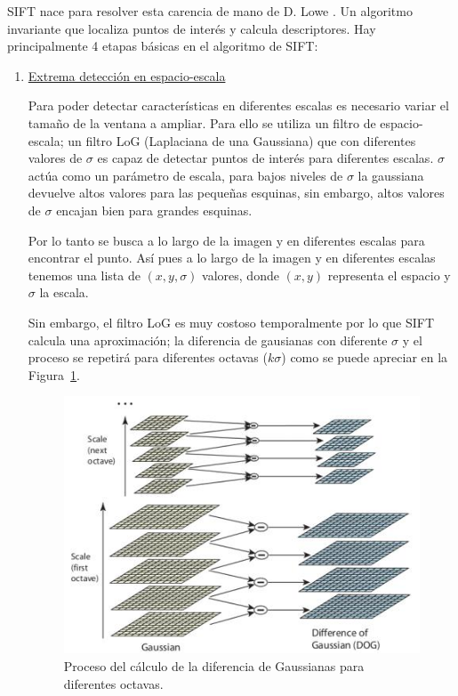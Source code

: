 SIFT nace para resolver esta carencia de mano de D. Lowe \parencite{Reference10}. Un algoritmo invariante que localiza puntos de interés y calcula descriptores. Hay principalmente 4 etapas básicas en el algoritmo de SIFT:

\begin{enumerate}
\item \underline{Extrema detección en espacio-escala}

Para poder detectar características en diferentes escalas es necesario variar el tamaño de la ventana a ampliar. Para ello se utiliza un filtro de espacio-escala; un filtro LoG (Laplaciana de una Gaussiana) que con diferentes valores de $\sigma$ es capaz de detectar puntos de interés para diferentes escalas. $\sigma$ actúa como un parámetro de escala, para bajos niveles de $\sigma$ la gaussiana devuelve altos valores para las pequeñas esquinas, sin embargo, altos valores de $\sigma$ encajan bien para grandes esquinas.

Por lo tanto se busca a lo largo de la imagen y en diferentes escalas para encontrar el punto. Así pues a lo largo de la imagen y en diferentes escalas tenemos una lista de $(x,y,\sigma)$ valores, donde $(x,y)$ representa el espacio y $\sigma$ la escala.

Sin embargo, el filtro LoG es muy costoso temporalmente por lo que SIFT calcula una aproximación; la diferencia de gausianas con diferente $\sigma$ y el proceso se repetirá para diferentes octavas ($k\sigma$) como se puede apreciar en la Figura~\ref{fig:shif_dog}.

\begin{figure}[ht]
\centering
\includegraphics[scale=0.7]{Figures/sift_dog.jpg}
\decoRule
\caption[Diferencia de gaussianas en SIFT]{Proceso del cálculo de la diferencia de Gaussianas para diferentes octavas.}
\label{fig:shif_dog}
\end{figure}


\end{enumerate}
